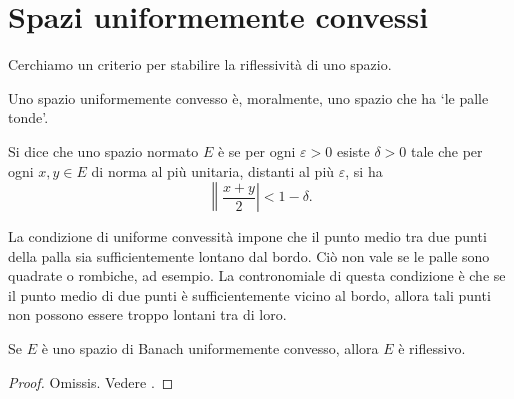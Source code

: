 \section{Spazi uniformemente convessi}
Cerchiamo un criterio per stabilire la riflessività di uno spazio.

Uno spazio uniformemente convesso è, moralmente, uno spazio che ha `le palle tonde'.

\begin{definition}
	Si dice che uno spazio normato $E$ è  se per ogni $\varepsilon > 0$ esiste $\delta > 0$ tale che per ogni $x,y \in E$ di norma al più unitaria, distanti al più $\varepsilon$, si ha
	\begin{equation*}
		\left\|\frac{x+y}2\right| < 1-\delta.
	\end{equation*}
\end{definition}

La condizione di uniforme convessità impone che il punto medio tra due punti della palla sia sufficientemente lontano dal bordo. Ciò non vale se le palle sono quadrate o rombiche, ad esempio.
La contronomiale di questa condizione è che se il punto medio di due punti è sufficientemente vicino al bordo, allora tali punti non possono essere troppo lontani tra di loro.

\begin{theorem}[Milman]
\label{th:milman}
	Se $E$ è uno spazio di Banach uniformemente convesso, allora $E$ è riflessivo.
\end{theorem}
\begin{proof}
	Omissis. Vedere \cite{dunford1958linear}.
\end{proof}

